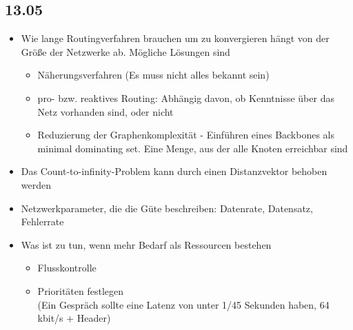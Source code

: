 \documentclass{article} %
\begin{document}
	\subsection{13.05}
	\begin{itemize}
		\item Wie lange Routingverfahren brauchen um zu konvergieren hängt von der Größe der Netzwerke ab. Mögliche Lösungen sind
		\begin{itemize}
			\item Näherungsverfahren (Es muss nicht alles bekannt sein)
			\item pro- bzw. reaktives Routing: Abhängig davon, ob Kenntnisse über das Netz vorhanden sind, oder nicht
			\item Reduzierung der Graphenkomplexität - Einführen eines Backbones als \glqq minimal dominating set\grqq. Eine Menge, aus der alle Knoten erreichbar sind
		\end{itemize}
		\item Das Count-to-infinity-Problem kann durch einen Distanzvektor behoben werden
		\item Netzwerkparameter, die die Güte beschreiben: Datenrate, Datensatz, Fehlerrate
		\item Was ist zu tun, wenn mehr Bedarf als Ressourcen bestehen
		\begin{itemize}
			\item Flusskontrolle
			\item Prioritäten festlegen \\
			(Ein Gespräch sollte eine Latenz von unter 1/45 Sekunden haben, 64 kbit/s + Header)
		\end{itemize}
	\end{itemize}	
\end{document}
